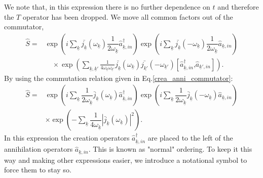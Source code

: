 \documentclass[12pt, titlepage]{article}
\begin{document}
We note that, in this expression there is no further dependence on $ t $ and therefore the $ T $ operator has been dropped. We move all common factors out of the commutator,
\begin{equation}\label{S_all_3_exp}
\begin{split}
\hat{S}=
& 
\exp
    \left(
       i
    \sum_{\underline{k}}
    \bar{j_{\underline{k}}}(\omega_{\underline{k}})
     	\dfrac{1}{2\omega_{\underline{k}}}
			\hat{a}^{\dagger}_{\underline{k},in} 
    \right)
     \exp
    \left(
           i
    \sum_{\underline{k}}
    \bar{j_{\underline{k}}}(-\omega_{\underline{k}})
     	\dfrac{1}{2\omega_{\underline{k}}}
			\hat{a}_{\underline{k},in} 
    \right)    
	\\
&\quad
   \times 
   \exp
    \left(    
    \sum_{\underline{k},\underline{k}'}
       \frac{1}{4\omega_{\underline{k}}\omega_{\underline{k}'}}
       \bar{j_{\underline{k}}}(\omega_{\underline{k}})
       \bar{j_{\underline{k'}}}(-\omega_{\underline{k}'})
            	\left[
			\hat{a}^{\dagger}_{\underline{k},in} 
     	\textbf{,}
			\hat{a}_{\underline{k}',in} 
		\right]  
		\right)      	
	.
\end{split}
\end{equation}
By using the commutation relation given in Eq.\enskip\eqref{crea_anni_commutator}:
\begin{equation}\label{S_for_probability}
\begin{split}
\hat{S}=&	
\exp
    \left(
       i
    \sum_{\underline{k}}
     	\dfrac{1}{2\omega_{\underline{k}}}
     	 \bar{j}_{\underline{k}}(\omega_{\underline{k}})
			\hat{a}^{\dagger}_{\underline{k},in}     
    \right)
        \exp
    \left(
     	  i
    	\sum_{\underline{k}}
     	\dfrac{1}{2\omega_{\underline{k}}}
      \bar{j}_{\underline{k}}(-\omega_{\underline{k}})
			\hat{a}_{\underline{k},in}  		
    \right)
    	\\
&
  \times \exp
    \left(
       -
    \sum_{\underline{k}}
     	\dfrac{1}{4\omega_{\underline{k}}}
    	| \bar{j}_{\underline{k}}(\omega_{\underline{k}})|^2
    \right)	
	.
\end{split}
\end{equation}
In this expression the creation operators $ \hat{a}^{\dagger}_{\underline{k},in} $ are placed to the left of the annihilation operators $ \hat{a}_{\underline{k},in} $. This is known as "normal" ordering. To keep it this way and making other expressions easier, we introduce a notational symbol to force them to stay so.
\end{document}

